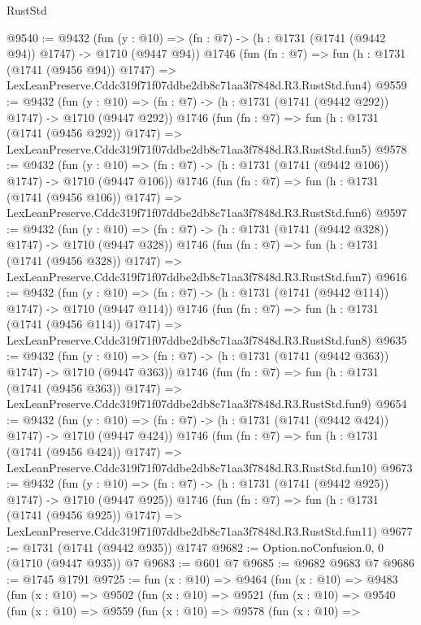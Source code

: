 \begin{lexlean}{RustStd}
\begin{coremodule}
@9540 := @9432
    (fun (y : @10) => (fn : @7) -> (h : @1731 (@1741 (@9442 @94)) @1747) -> @1710 (@9447 @94))
    @1746
    (fun (fn : @7) =>
    fun (h : @1731 (@1741 (@9456 @94)) @1747) =>
    LexLeanPreserve.Cddc319f71f07ddbe2db8c71aa3f7848d.R3.RustStd.fun4)
@9559 := @9432
    (fun (y : @10) => (fn : @7) -> (h : @1731 (@1741 (@9442 @292)) @1747) -> @1710 (@9447 @292))
    @1746
    (fun (fn : @7) =>
    fun (h : @1731 (@1741 (@9456 @292)) @1747) =>
    LexLeanPreserve.Cddc319f71f07ddbe2db8c71aa3f7848d.R3.RustStd.fun5)
@9578 := @9432
    (fun (y : @10) => (fn : @7) -> (h : @1731 (@1741 (@9442 @106)) @1747) -> @1710 (@9447 @106))
    @1746
    (fun (fn : @7) =>
    fun (h : @1731 (@1741 (@9456 @106)) @1747) =>
    LexLeanPreserve.Cddc319f71f07ddbe2db8c71aa3f7848d.R3.RustStd.fun6)
@9597 := @9432
    (fun (y : @10) => (fn : @7) -> (h : @1731 (@1741 (@9442 @328)) @1747) -> @1710 (@9447 @328))
    @1746
    (fun (fn : @7) =>
    fun (h : @1731 (@1741 (@9456 @328)) @1747) =>
    LexLeanPreserve.Cddc319f71f07ddbe2db8c71aa3f7848d.R3.RustStd.fun7)
@9616 := @9432
    (fun (y : @10) => (fn : @7) -> (h : @1731 (@1741 (@9442 @114)) @1747) -> @1710 (@9447 @114))
    @1746
    (fun (fn : @7) =>
    fun (h : @1731 (@1741 (@9456 @114)) @1747) =>
    LexLeanPreserve.Cddc319f71f07ddbe2db8c71aa3f7848d.R3.RustStd.fun8)
@9635 := @9432
    (fun (y : @10) => (fn : @7) -> (h : @1731 (@1741 (@9442 @363)) @1747) -> @1710 (@9447 @363))
    @1746
    (fun (fn : @7) =>
    fun (h : @1731 (@1741 (@9456 @363)) @1747) =>
    LexLeanPreserve.Cddc319f71f07ddbe2db8c71aa3f7848d.R3.RustStd.fun9)
@9654 := @9432
    (fun (y : @10) => (fn : @7) -> (h : @1731 (@1741 (@9442 @424)) @1747) -> @1710 (@9447 @424))
    @1746
    (fun (fn : @7) =>
    fun (h : @1731 (@1741 (@9456 @424)) @1747) =>
    LexLeanPreserve.Cddc319f71f07ddbe2db8c71aa3f7848d.R3.RustStd.fun10)
@9673 := @9432
    (fun (y : @10) => (fn : @7) -> (h : @1731 (@1741 (@9442 @925)) @1747) -> @1710 (@9447 @925))
    @1746
    (fun (fn : @7) =>
    fun (h : @1731 (@1741 (@9456 @925)) @1747) =>
    LexLeanPreserve.Cddc319f71f07ddbe2db8c71aa3f7848d.R3.RustStd.fun11)
@9677 := @1731 (@1741 (@9442 @935)) @1747
@9682 := Option.noConfusion.{0, 0} (@1710 (@9447 @935)) @7
@9683 := @601 @7
@9685 := @9682 @9683 @7
@9686 := @1745 @1791
@9725 := fun (x : @10) =>
  @9464
    (fun (x : @10) =>
    @9483
      (fun (x : @10) =>
      @9502
        (fun (x : @10) =>
        @9521
          (fun (x : @10) =>
          @9540
            (fun (x : @10) =>
            @9559
              (fun (x : @10) =>
              @9578
                (fun (x : @10) =>

\end{coremodule}
\end{lexlean}
